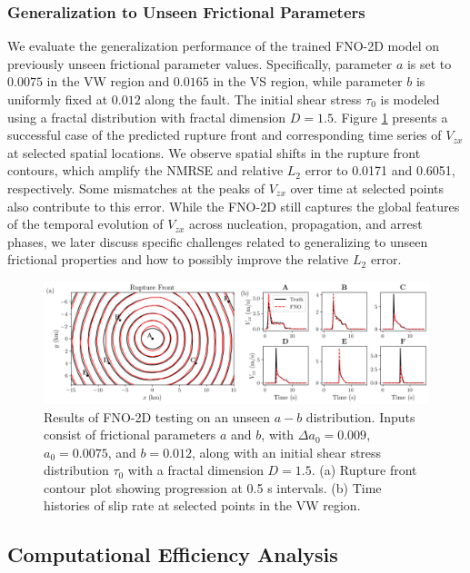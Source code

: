 \documentclass[draft]{agujournal2019}
\begin{document}
\subsubsection{Generalization to Unseen Frictional Parameters}
\label{sec:FNO-2D_unseen_ab}

We evaluate the generalization performance of the trained FNO-2D model on previously unseen frictional parameter values. Specifically, parameter \(a\) is set to \(0.0075\) in the VW region and \(0.0165\) in the VS region, while parameter \(b\) is uniformly fixed at \(0.012\) along the fault. The initial shear stress \(\tau_{0}\) is modeled using a fractal distribution with fractal dimension \(D = 1.5\). Figure \ref{fig:3D_unseen_ab} presents a successful case of the predicted rupture front and corresponding time series of \(V_{zx}\) at selected spatial locations. We observe spatial shifts in the rupture front contours, which amplify the NMRSE and  relative \(L_2\) error to 0.0171 and 0.6051, respectively. Some mismatches at the peaks of \(V_{zx}\) over time at selected points also contribute to this error. While the FNO-2D still captures the global features of the temporal evolution of \(V_{zx}\) across nucleation, propagation, and arrest phases, we later discuss specific challenges related to generalizing to unseen frictional properties and how to possibly improve the relative \(L_2\) error.

\begin{figure}
\centering
\includegraphics[width=1.0\linewidth]{3D_rupture_front_ab009_2.png}
\caption{\label{fig:3D_unseen_ab}Results of FNO-2D testing on an unseen \(a-b\) distribution. Inputs consist of frictional parameters \(a\) and \(b\), with \(\Delta a_{0} = 0.009\), \(a_{0} = 0.0075\), and \(b = 0.012\), along with an initial shear stress distribution \(\tau_{0}\) with a fractal dimension \(D = 1.5\). (a) Rupture front contour plot showing progression at 0.5 s intervals. (b) Time histories of slip rate at selected points in the VW region.
}
\end{figure}

\subsection{Computational Efficiency Analysis}
\label{sec:comp_efficienvy}
\end{document}
